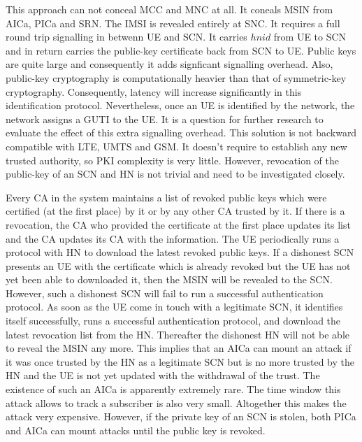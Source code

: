 \documentclass[lnicst,sechang,a4paper]{svmultln}
\begin{document}
This approach can not conceal MCC and MNC at all. It coneals MSIN from AICa, PICa and SRN. The IMSI is revealed entirely at SNC. It requires a full round trip signalling in betwenn UE and SCN. It carries $hnid$ from UE to SCN and in return carries the public-key certificate back from SCN to UE. Public keys are quite large and consequently it adds signficant signalling overhead. Also, public-key cryptography is computationally heavier than that of symmetric-key cryptography. Consequently, latency will increase significantly in this identification protocol. Nevertheless, once an UE is identified by the network, the network assigns a GUTI to the UE. It is a question for further research to evaluate the effect of this extra signalling overhead. This solution is not backward compatible with LTE, UMTS and GSM. It doesn't require to establish any new trusted authority, so PKI complexity is very little. However, revocation of the public-key of an SCN and HN is not trivial and need to be investigated closely.

Every CA in the system maintains a list of revoked public keys which were certified (at the first place) by it or by any other CA trusted by it. If there is a revocation, the CA who provided the certificate at the first place updates its list and the CA updates its CA with the information. The UE periodically runs a protocol with HN to download the latest revoked public keys. If a dishonest SCN presents an UE with the certificate which is already revoked but the UE has not yet been able to downloaded it, then the MSIN will be revealed to the SCN. However, such a dishonest SCN will fail to run a successful authentication protocol. As soon as the UE come in touch with a legitimate SCN, it identifies itself successfully, runs a successful authentication protocol, and download the latest revocation list from the HN. Thereafter the dishonest HN will not be able to reveal the MSIN any more. This implies that an AICa can mount an attack if it was once trusted by the HN as a legitimate SCN but is no more trusted by the HN and the UE is not yet updated with the withdrawal of the trust. The existence of such an AICa is apparently extremely rare. The time window this attack allows to track a subscriber is also very small. Altogether this makes the attack very expensive. However, if the private key of an SCN is stolen, both PICa and AICa can mount attacks until the public key is revoked. 
\end{document}
